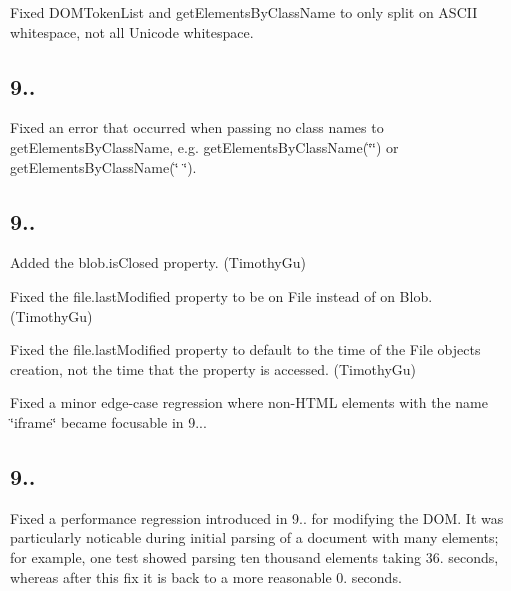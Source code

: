 \begin{DoxyItemize}
\item Fixed {\ttfamily D\+O\+M\+Token\+List} and {\ttfamily get\+Elements\+By\+Class\+Name} to only split on A\+S\+C\+II whitespace, not all Unicode whitespace.
\end{DoxyItemize}

\subsection*{9..}


\begin{DoxyItemize}
\item Fixed an error that occurred when passing no class names to {\ttfamily get\+Elements\+By\+Class\+Name}, e.\+g. {\ttfamily get\+Elements\+By\+Class\+Name(\char`\"{}\char`\"{})} or {\ttfamily get\+Elements\+By\+Class\+Name(\char`\"{} \char`\"{})}.
\end{DoxyItemize}

\subsection*{9..}


\begin{DoxyItemize}
\item Added the {\ttfamily blob.\+is\+Closed} property. (Timothy\+Gu)
\item Fixed the {\ttfamily file.\+last\+Modified} property to be on {\ttfamily File} instead of on {\ttfamily Blob}. (Timothy\+Gu)
\item Fixed the {\ttfamily file.\+last\+Modified} property to default to the time of the {\ttfamily File} object\textquotesingle{}s creation, not the time that the property is accessed. (Timothy\+Gu)
\item Fixed a minor edge-\/case regression where non-\/\+H\+T\+ML elements with the name {\ttfamily \char`\"{}iframe\char`\"{}} became focusable in 9...
\end{DoxyItemize}

\subsection*{9..}


\begin{DoxyItemize}
\item Fixed a performance regression introduced in 9.. for modifying the D\+OM. It was particularly noticable during initial parsing of a document with many elements; for example, one test showed parsing ten thousand elements taking 36. seconds, whereas after this fix it is back to a more reasonable 0. seconds.
\end{DoxyItemize}

